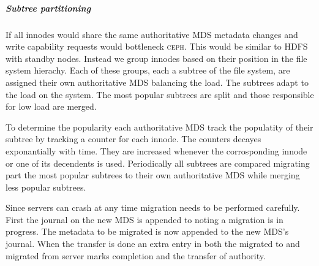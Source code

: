\subparagraph{Subtree partitioning}
If all innodes would share the same authoritative MDS metadata changes and write capability requests would bottleneck \textsc{ceph}. This would be similar to HDFS with standby nodes. Instead we group innodes based on their position in the file system hierachy. Each of these groups, each a subtree of the file system, are assigned their own authoritative MDS balancing the load. The subtrees adapt to the load on the system. The most popular subtrees are split and those responsible for low load are merged.

To determine the popularity each authoritative MDS track the populatity of their subtree by tracking a counter for each innode. The counters decayes exponantially with time. They are increased whenever the corrosponding innode or one of its decendents is used. Periodically all subtrees are compared migrating part the most popular subtrees to their own authoritative MDS while merging less popular subtrees.

Since servers can crash at any time migration needs to be performed carefully. First the journal on the new MDS is appended to noting a migration is in progress. The metadata to be migrated is now appended to the new MDS's journal. When the transfer is done an extra entry in both the migrated to and migrated from server marks completion and the transfer of authority. 
